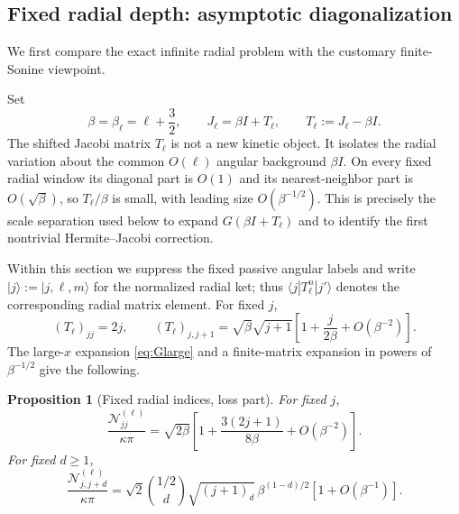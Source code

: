 \documentclass[11pt]{article}
\numberwithin{equation}{section}
\newtheorem{proposition}[theorem]{Proposition}
\theoremstyle{definition}
\begin{document}
\subsection{Fixed radial depth: asymptotic diagonalization}

We first compare the exact infinite radial problem with the customary
finite-Sonine viewpoint.

Set
\begin{equation}
 \beta=\beta_\ell=\ell+\frac32,
 \qquad
 J_\ell=\beta I+T_\ell,
 \qquad
 T_\ell:=J_\ell-\beta I.
 \label{eq:T_shift_definition}
\end{equation}
The shifted Jacobi matrix $T_\ell$ is not a new kinetic object.  It isolates
the radial variation about the common $O(\ell)$ angular background
$\beta I$.  On every fixed radial window its diagonal part is $O(1)$ and its
nearest-neighbor part is $O(\sqrt\beta)$, so $T_\ell/\beta$ is small, with
leading size $O(\beta^{-1/2})$.  This is precisely the scale separation used
below to expand $G(\beta I+T_\ell)$ and to identify the first nontrivial
Hermite--Jacobi correction.

Within this section we suppress the fixed passive angular labels and write
$|j\rangle:=|j,\ell,m\rangle$ for the normalized radial ket; thus
$\langle j|T_\ell^n|j'\rangle$ denotes the corresponding radial matrix
element.  For fixed $j$,
\begin{equation}
 (T_\ell)_{jj}=2j,
 \qquad
 (T_\ell)_{j,j+1}
 =
 \sqrt{\beta}\sqrt{j+1}
 \left[1+\frac{j}{2\beta}+O(\beta^{-2})\right].
\end{equation}
The large-$x$ expansion \eqref{eq:Glarge} and a finite-matrix expansion in
powers of $\beta^{-1/2}$ give the following.

\begin{proposition}[Fixed radial indices, loss part]
For fixed $j$,
\begin{equation}
 \frac{\mathcal N^{(\ell)}_{jj}}{\kappa\pi}
 =
 \sqrt{2\beta}
 \left[
 1+
 \frac{3(2j+1)}{8\beta}
 +O(\beta^{-2})
 \right].
 \label{eq:large_l_diag}
\end{equation}
For fixed $d\ge1$,
\begin{equation}
 \frac{\mathcal N^{(\ell)}_{j,j+d}}{\kappa\pi}
 =
 \sqrt2
 \binom{1/2}{d}
 \sqrt{(j+1)_d}\,
 \beta^{(1-d)/2}
 \left[1+O(\beta^{-1})\right].
 \label{eq:large_l_offdiag}
\end{equation}
\end{proposition}
\end{document}
